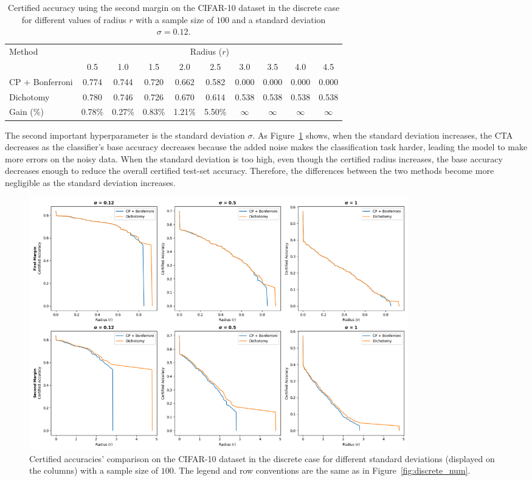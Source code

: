 \begin{table}[htbp]
    \centering
    \caption{Certified accuracy using the second margin on the CIFAR-10 dataset in the discrete case for different values of radius $r$ with a sample size of $100$ and a standard deviation $\sigma = 0.12$.}
    \label{tab:simplified-certified-accuracy}
    \renewcommand{\arraystretch}{1.2}
    \begin{tabular}{l*{9}{c}}
        \toprule
        Method & \multicolumn{9}{c}{Radius ($r$)} \\
        \cmidrule(l){2-10}
        & 0.5 & 1.0 & 1.5 & 2.0 & 2.5 & 3.0 & 3.5 & 4.0 & 4.5 \\
        \midrule
        CP + Bonferroni & 0.774 & 0.744 & 0.720 & 0.662 & 0.582 & 0.000 & 0.000 & 0.000 & 0.000 \\
        Dichotomy              & 0.780 & 0.746 & 0.726 & 0.670 & 0.614 & 0.538 & 0.538 & 0.538 & 0.538 \\
        Gain (\%) & 0.78\% & 0.27\% & 0.83\% & 1.21\% & 5.50\% & $\infty$ & $\infty$ & $\infty$ & $\infty$ \\
        \bottomrule
    \end{tabular}
\end{table}

The second important hyperparameter is the standard deviation $\sigma$.
As Figure~\ref{fig:discrete_sigma} shows, when the standard deviation increases, the CTA decreases as the classifier’s base accuracy decreases because the added noise makes the classification task harder, leading the model to make more errors on the noisy data.
When the standard deviation is too high, even though the certified radius increases, the base accuracy decreases enough to reduce the overall certified test-set accuracy.
Therefore, the differences between the two methods become more negligible as the standard deviation increases.

\begin{figure}[htbp]
    \centering
    \includegraphics[width=0.8\textwidth]{images/discrete_sigma}
    \caption{Certified accuracies' comparison on the CIFAR-10 dataset in the discrete case for different standard deviations (displayed on the columns) with a sample size of $100$. The legend and row conventions are the same as in Figure~\ref{fig:discrete_num}.}
    \label{fig:discrete_sigma}
\end{figure}

